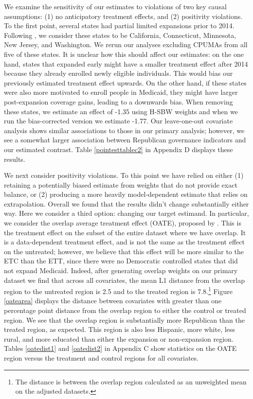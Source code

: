 \documentclass[12pt]{article}
\begin{document}
We examine the sensitivity of our estimates to violations of two key causal assumptions: (1) no anticipatory treatment effects, and (2) positivity violations. To the first point, several states had partial limited expansions prior to 2014. Following \cite{frean2017premium}, we consider these states to be California, Connecticut, Minnesota, New Jersey, and Washington. We rerun our analyses excluding CPUMAs from all five of these states. It is unclear how this should affect our estimates: on the one hand, states that expanded early might have a smaller treatment effect after 2014 because they already enrolled newly eligible individuals. This would bias our previously estimated treatment effect upwards. On the other hand, if these states were also more motivated to enroll people in Medicaid, they might have larger post-expansion coverage gains, leading to a downwards bias. When removing these states, we estimate an effect of -1.35 using H-SBW weights and when we run the bias-corrected version we estimate -1.77. Our leave-one-out covariate analysis shows similar associations to those in our primary analysis; however, we see a somewhat larger association between Republican governance indicators and our estimated contrast. Table \ref{pointesttablec2} in Appendix D displays these results. 

We next consider positivity violations. To this point we have relied on either (1) retaining a potentially biased estimate from weights that do not provide exact balance, or (2) producing a more heavily model-dependent estimate that relies on extrapolation. Overall we found that the results didn't change substantially either way. Here we consider a third option: changing our target estimand. In particular, we consider the overlap average treatment effect (OATE), proposed by \cite{li2018balancing}. This is the treatment effect on the subset of the entire dataset where we have overlap. It is a data-dependent treatment effect, and is not the same as the treatment effect on the untreated; however, we believe that this effect will be more similar to the ETC than the ETT, since there were no Democratic controlled states that did not expand Medicaid. Indeed, after generating overlap weights on our primary dataset we find that across all covariates, the mean L1 distance from the overlap region to the untreated region is 2.5 and to the treated region is 7.8.\footnote{The distance is between the overlap region calculated as an unweighted mean on the adjusted datasets.} Figure \ref{oatearea} displays the distance between covariates with greater than one percentage point distance from the overlap region to either the control or treated region. We see that the overlap region is substantially more Republican than the treated region, as expected. This region is also less Hispanic, more white, less rural, and more educated than either the expansion or non-expansion region. Tables \ref{oatedist1} and \ref{oatedist2} in Appendix C show statistics on the OATE region versus the treatment and control regions for all covariates.
\end{document}
